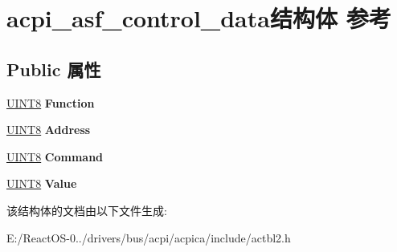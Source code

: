 \hypertarget{structacpi__asf__control__data}{}\section{acpi\+\_\+asf\+\_\+control\+\_\+data结构体 参考}
\label{structacpi__asf__control__data}
\subsection*{Public 属性}
\begin{DoxyCompactItemize}
\item 
\mbox{\label{structacpi__asf__control__data_a8d4c9f69a533e187bd8708edc5356947}} 
\hyperlink{_processor_bind_8h_ab27e9918b538ce9d8ca692479b375b6a}{U\+I\+N\+T8} {\bfseries Function}
\item 
\mbox{\label{structacpi__asf__control__data_a3198b9844a679e035505575ed16d4505}} 
\hyperlink{_processor_bind_8h_ab27e9918b538ce9d8ca692479b375b6a}{U\+I\+N\+T8} {\bfseries Address}
\item 
\mbox{\label{structacpi__asf__control__data_a94712490d569bae219681342f0271120}} 
\hyperlink{_processor_bind_8h_ab27e9918b538ce9d8ca692479b375b6a}{U\+I\+N\+T8} {\bfseries Command}
\item 
\mbox{\label{structacpi__asf__control__data_a631f5d6aa04e5d75adcb3c098c5dc9b8}} 
\hyperlink{_processor_bind_8h_ab27e9918b538ce9d8ca692479b375b6a}{U\+I\+N\+T8} {\bfseries Value}
\end{DoxyCompactItemize}


该结构体的文档由以下文件生成\+:\begin{DoxyCompactItemize}
\item 
E\+:/\+React\+O\+S-\/0../drivers/bus/acpi/acpica/include/actbl2.\+h\end{DoxyCompactItemize}
